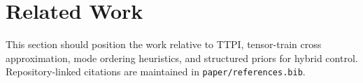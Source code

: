 \section{Related Work}

This section should position the work relative to TTPI, tensor-train cross
approximation, mode ordering heuristics, and structured priors for hybrid
control. Repository-linked citations are maintained in
\texttt{paper/references.bib}.
